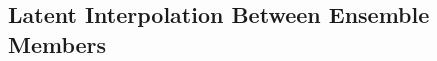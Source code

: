 \documentclass{agujournal2019}
\begin{document}


\subsection{Latent Interpolation Between Ensemble Members}
\end{document}
